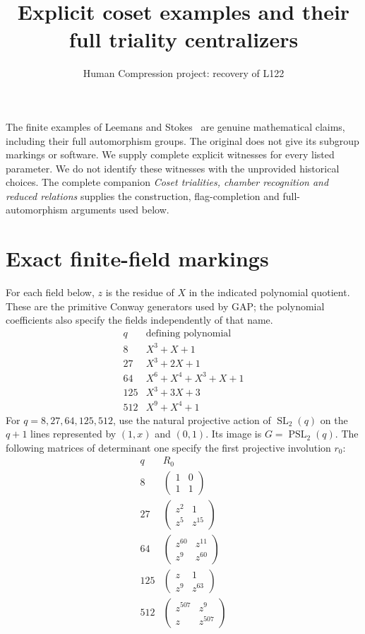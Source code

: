 \documentclass[11pt,a4paper]{article}
\title{Explicit coset examples and their full triality centralizers}
\author{Human Compression project: recovery of L122}\date{}
\begin{document}
\maketitle
The finite examples of Leemans and Stokes~\cite{LS} are genuine mathematical
claims, including their full automorphism groups. The original does not give
its subgroup markings or software. We supply complete explicit witnesses
for every listed parameter. We do not identify these witnesses with the
unprovided historical choices. The complete companion \emph{Coset trialities,
chamber recognition and reduced relations} supplies the construction,
flag-completion and full-automorphism arguments used below.

\section{Exact finite-field markings}
For each field below, $z$ is the residue of $X$ in the indicated polynomial
quotient. These are the primitive Conway generators used by GAP; the
polynomial coefficients also specify the fields independently of that name.
\[
\begin{array}{c|l}
q&\text{defining polynomial}\\\hline
8&X^3+X+1\\
27&X^3+2X+1\\
64&X^6+X^4+X^3+X+1\\
125&X^3+3X+3\\
512&X^9+X^4+1
\end{array}
\]
For $q=8,27,64,125,512$, use the natural projective action of
$\operatorname{SL}_2(q)$ on the $q+1$ lines represented by $(1,x)$ and
$(0,1)$. Its image is $G=\operatorname{PSL}_2(q)$. The following
matrices of determinant one specify the first projective involution $r_0$:
\[
\begin{array}{c|c}
q&R_0\\\hline
8&\begin{pmatrix}1&0\\1&1\end{pmatrix}\\[2mm]
27&\begin{pmatrix}z^2&1\\z^5&z^{15}\end{pmatrix}\\[2mm]
64&\begin{pmatrix}z^{60}&z^{11}\\z^9&z^{60}\end{pmatrix}\\[2mm]
125&\begin{pmatrix}z&1\\z^9&z^{63}\end{pmatrix}\\[2mm]
512&\begin{pmatrix}z^{507}&z^9\\z&z^{507}\end{pmatrix}
\end{array}
\]
\end{document}
